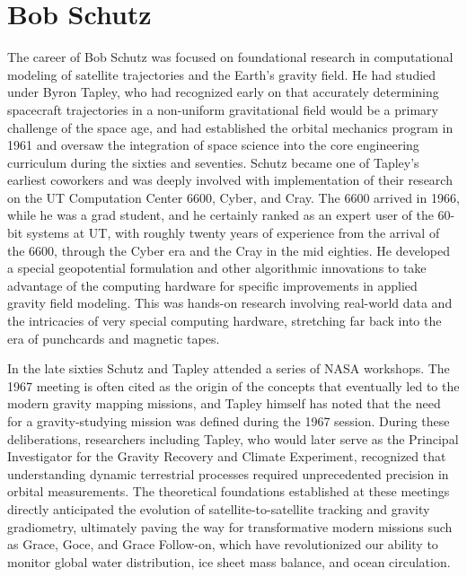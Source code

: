 \chapter{Bob Schutz}

The career of Bob Schutz was focused on foundational research in computational modeling of satellite trajectories and the Earth's gravity field. He had studied under Byron Tapley, who had recognized early on that accurately determining spacecraft trajectories in a non-uniform gravitational field would be a primary challenge of the space age, and had established the orbital mechanics program in 1961 and oversaw the integration of space science into the core engineering curriculum during the sixties and seventies. Schutz became one of Tapley’s earliest coworkers and was deeply involved with implementation of their research on the UT Computation Center 6600, Cyber, and Cray. The 6600 arrived in 1966, while he was a grad student, and he certainly ranked as an expert user of the 60-bit systems at UT, with roughly twenty years of experience from the arrival of the 6600, through the Cyber era and the Cray in the mid eighties. He developed a special geopotential formulation and other algorithmic innovations to take advantage of the computing hardware for specific improvements in applied gravity field modeling. This was hands-on research involving real-world data and the intricacies of very special computing hardware, stretching far back into the era of punchcards and magnetic tapes.

In the late sixties Schutz and Tapley attended a series of NASA workshops. The 1967 meeting is often cited as the origin of the concepts that eventually led to the modern gravity mapping missions, and Tapley himself has noted that the need for a gravity-studying mission was defined during the 1967 session. During these deliberations, researchers including Tapley, who would later serve as the Principal Investigator for the Gravity Recovery and Climate Experiment, recognized that understanding dynamic terrestrial processes required unprecedented precision in orbital measurements. The theoretical foundations established at these meetings directly anticipated the evolution of satellite-to-satellite tracking and gravity gradiometry, ultimately paving the way for transformative modern missions such as Grace, Goce, and Grace Follow-on, which have revolutionized our ability to monitor global water distribution, ice sheet mass balance, and ocean circulation. \cite{nrcUsefulApplicationsEarthoriented1969}

